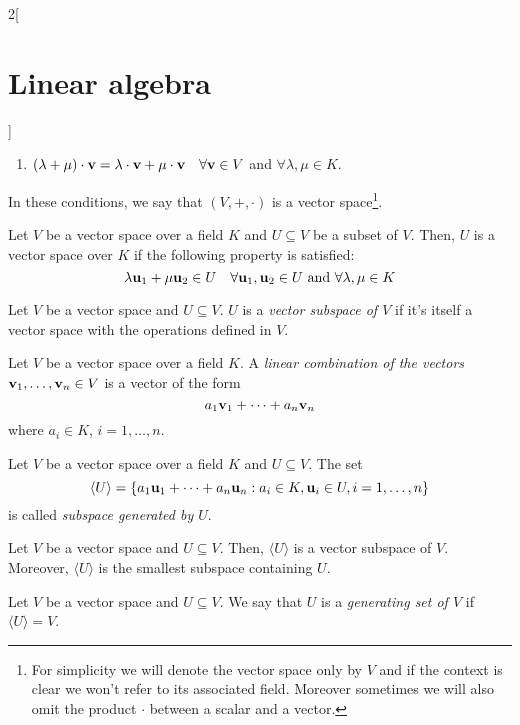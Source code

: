 \documentclass[../../../main.tex]{subfiles}
\begin{document}
\begin{multicols}{2}[\section{Linear algebra}]
\begin{definition}
\begin{enumerate}
            \item $(\lambda+\mu)\cdot\boldsymbol{\mathrm{v}}=\lambda\cdot\boldsymbol{\mathrm{v}}+\mu\cdot\boldsymbol{\mathrm{v}}\quad\forall\boldsymbol{\mathrm{v}}\in V$ and $\forall\lambda,\mu\in K$.
        \end{enumerate}
        In these conditions, we say that $(V,+,\cdot)$ is a vector space\footnote{For simplicity we will denote the vector space only by $V$ and if the context is clear we won't refer to its associated field. Moreover sometimes we will also omit the product $\cdot$ between a scalar and a vector.}.
    \end{definition}
    \begin{definition}
        Let $V$ be a vector space over a field $K$ and $U\subseteq V$ be a subset of $V$. Then, $U$ is a vector space over $K$ if the following property is satisfied:
        $$\lambda \boldsymbol{\mathrm{u}}_1+\mu \boldsymbol{\mathrm{u}}_2\in U\quad\forall \boldsymbol{\mathrm{u}}_1,\boldsymbol{\mathrm{u}}_2\in U\text{ and }\forall\lambda,\mu\in K$$
    \end{definition}
    \begin{definition}
        Let $V$ be a vector space and $U\subseteq V$. $U$ is a \textit{vector subspace of $V$} if it's itself a vector space with the operations defined in $V$.
    \end{definition}
    \begin{definition}
        Let $V$ be a vector space over a field $K$. A \textit{linear combination of the vectors $\boldsymbol{\mathrm{v}}_1,\ldots,\boldsymbol{\mathrm{v}}_n\in V$} is a vector of the form $$a_1\boldsymbol{\mathrm{v}}_1+\cdots+a_n\boldsymbol{\mathrm{v}}_n$$ where $a_i\in K$, $i=1,\ldots,n$.
    \end{definition}
    \begin{definition}
        Let $V$ be a vector space over a field $K$ and $U\subseteq V$. The set $$\langle U\rangle=\{a_1\boldsymbol{\mathrm{u}}_1+\cdots+a_n\boldsymbol{\mathrm{u}}_n:a_i\in K,\boldsymbol{\mathrm{u}}_i\in U,i=1,\ldots,n\}$$ is called \textit{subspace generated by $U$}.
    \end{definition}
    \begin{lemma}
        Let $V$ be a vector space and $U\subseteq V$. Then, $\langle U\rangle$ is a vector subspace of $V$. Moreover, $\langle U\rangle$ is the smallest subspace containing $U$.
    \end{lemma}
    \begin{definition}
        Let $V$ be a vector space and $U\subseteq V$. We say that $U$ is a \textit{generating set of $V$} if $\langle U\rangle=V$.
    \end{definition}

\end{multicols}
\end{document}
